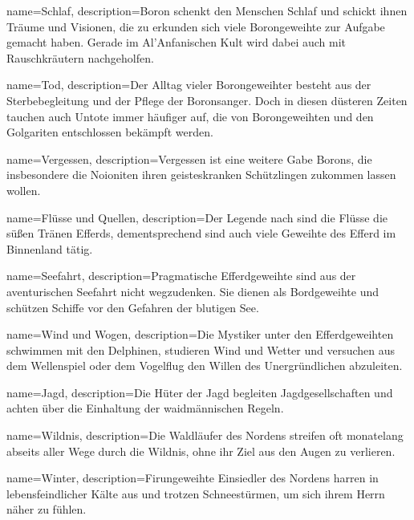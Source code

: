 {
    name={Schlaf},
    description={Boron schenkt den Menschen Schlaf und schickt ihnen Träume und Visionen, die zu erkunden sich viele Borongeweihte zur Aufgabe gemacht haben. Gerade im Al’Anfanischen Kult wird dabei auch mit Rauschkräutern nachgeholfen. }
}


{
    name={Tod},
    description={Der Alltag vieler Borongeweihter besteht aus der Sterbebegleitung und der Pflege der Boronsanger. Doch in diesen düsteren Zeiten tauchen auch Untote immer häufiger auf, die von Borongeweihten und den Golgariten entschlossen bekämpft werden.}
}


{
    name={Vergessen},
    description={Vergessen ist eine weitere Gabe Borons, die insbesondere die Noioniten ihren geisteskranken Schützlingen zukommen lassen wollen. }
}


{
    name={Flüsse und Quellen},
    description={Der Legende nach sind die Flüsse die süßen Tränen Efferds, dementsprechend sind auch viele Geweihte des Efferd im Binnenland tätig.}
}


{
    name={Seefahrt},
    description={Pragmatische Efferdgeweihte sind aus der aventurischen Seefahrt nicht wegzudenken. Sie dienen als Bordgeweihte und schützen Schiffe vor den Gefahren der blutigen See. }
}


{
    name={Wind und Wogen},
    description={Die Mystiker unter den Efferdgeweihten schwimmen mit den Delphinen, studieren Wind und Wetter und versuchen aus dem Wellenspiel oder dem Vogelflug den Willen des Unergründlichen abzuleiten.}
}


{
    name={Jagd},
    description={Die Hüter der Jagd begleiten Jagdgesellschaften und achten über die Einhaltung der waidmännischen Regeln.}
}


{
    name={Wildnis},
    description={Die Waldläufer des Nordens streifen oft monatelang abseits aller Wege durch die Wildnis, ohne ihr Ziel aus den Augen zu verlieren.}
}


{
    name={Winter},
    description={Firungeweihte Einsiedler des Nordens harren in lebensfeindlicher Kälte aus und trotzen Schneestürmen, um sich ihrem Herrn näher zu fühlen.}
}


